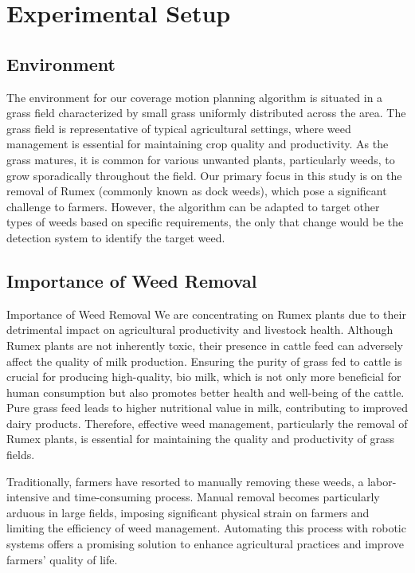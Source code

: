 \section{Experimental Setup}

\subsection{Environment}
The environment for our coverage motion planning algorithm is situated in a grass field characterized by small grass uniformly distributed across the area. The grass field is representative of typical agricultural settings, where weed management is essential for maintaining crop quality and productivity. As the grass matures, it is common for various unwanted plants, particularly weeds, to grow sporadically throughout the field. Our primary focus in this study is on the removal of Rumex (commonly known as dock weeds), which pose a significant challenge to farmers. However, the algorithm can be adapted to target other types of weeds based on specific requirements, the only that change would be the detection system to identify the target weed.

\subsection{Importance of Weed Removal}
Importance of Weed Removal
We are concentrating on Rumex plants due to their detrimental impact on agricultural productivity and livestock health. Although Rumex plants are not inherently toxic, their presence in cattle feed can adversely affect the quality of milk production. Ensuring the purity of grass fed to cattle is crucial for producing high-quality, bio milk, which is not only more beneficial for human consumption but also promotes better health and well-being of the cattle. Pure grass feed leads to higher nutritional value in milk, contributing to improved dairy products. Therefore, effective weed management, particularly the removal of Rumex plants, is essential for maintaining the quality and productivity of grass fields.


\vspace*{6mm} 


Traditionally, farmers have resorted to manually removing these weeds, a labor-intensive and time-consuming process. Manual removal becomes particularly arduous in large fields, imposing significant physical strain on farmers and limiting the efficiency of weed management. Automating this process with robotic systems offers a promising solution to enhance agricultural practices and improve farmers' quality of life.

